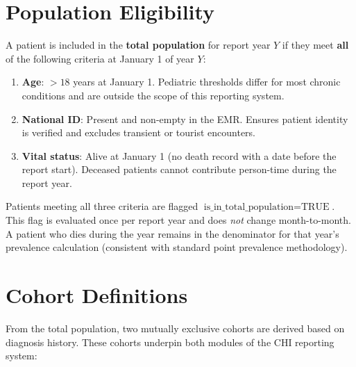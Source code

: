 \documentclass[11pt,a4paper]{article}
\begin{document}
\section{Population Eligibility}

A patient is included in the \textbf{total population} for report year $Y$ if they meet \textbf{all} of the following criteria at January 1 of year $Y$:

\begin{enumerate}[label=\textbf{C\arabic*}, leftmargin=*]
    \item \textbf{Age}: $> 18$ years at January 1. Pediatric thresholds differ for most chronic conditions and are outside the scope of this reporting system.
    \item \textbf{National ID}: Present and non-empty in the EMR. Ensures patient identity is verified and excludes transient or tourist encounters.
    \item \textbf{Vital status}: Alive at January 1 (no death record with a date before the report start). Deceased patients cannot contribute person-time during the report year.
\end{enumerate}

Patients meeting all three criteria are flagged $\text{is\_in\_total\_population} = \text{TRUE}$. This flag is evaluated once per report year and does \textit{not} change month-to-month. A patient who dies during the year remains in the denominator for that year's prevalence calculation (consistent with standard point prevalence methodology).

\section{Cohort Definitions}

From the total population, two mutually exclusive cohorts are derived based on diagnosis history. These cohorts underpin both modules of the CHI reporting system:
\end{document}

